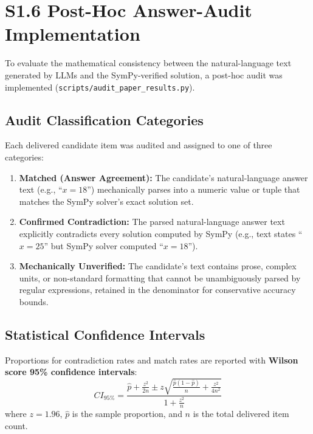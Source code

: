 \documentclass[11pt,letterpaper]{article}
\begin{document}
\section{S1.6 Post-Hoc Answer-Audit Implementation}\label{sec:s16-answer-audit}

To evaluate the mathematical consistency between the natural-language text generated by LLMs and the SymPy-verified solution, a post-hoc audit was implemented (\texttt{scripts/audit\_paper\_results.py}).

\subsection{Audit Classification Categories}
Each delivered candidate item was audited and assigned to one of three categories:
\begin{enumerate}
    \item \textbf{Matched (Answer Agreement):} The candidate's natural-language answer text (e.g., ``$x = 18$'') mechanically parses into a numeric value or tuple that matches the SymPy solver's exact solution set.
    \item \textbf{Confirmed Contradiction:} The parsed natural-language answer text explicitly contradicts every solution computed by SymPy (e.g., text states ``$x = 25$'' but SymPy solver computed ``$x = 18$'').
    \item \textbf{Mechanically Unverified:} The candidate's text contains prose, complex units, or non-standard formatting that cannot be unambiguously parsed by regular expressions, retained in the denominator for conservative accuracy bounds.
\end{enumerate}

\subsection{Statistical Confidence Intervals}
Proportions for contradiction rates and match rates are reported with \textbf{Wilson score 95\% confidence intervals}:
\begin{equation}
    CI_{95\%} = \frac{\hat{p} + \frac{z^2}{2n} \pm z \sqrt{\frac{\hat{p}(1-\hat{p})}{n} + \frac{z^2}{4n^2}}}{1 + \frac{z^2}{n}}
\end{equation}
where $z = 1.96$, $\hat{p}$ is the sample proportion, and $n$ is the total delivered item count.
\end{document}
